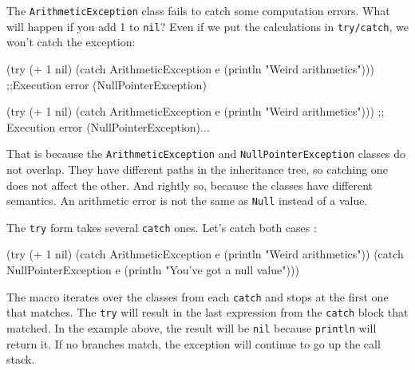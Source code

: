 The \verb|ArithmeticException| class fails to catch some computation errors.
What will happen if you add 1 to \verb|nil|? Even if we put the calculations in \verb|try/catch|, we won't catch the exception: 

\ifx\DEVICETYPE\MOBILE

\begin{english}
  \begin{clojure}
(try
  (+ 1 nil)
  (catch ArithmeticException e
    (println "Weird arithmetics")))
;;Execution error (NullPointerException)
  \end{clojure}
\end{english}

\else

\begin{english}
  \begin{clojure}
(try
  (+ 1 nil)
  (catch ArithmeticException e
    (println "Weird arithmetics")))
;; Execution error (NullPointerException)...
  \end{clojure}
\end{english}

\fi


\noindent
That is because the \verb|ArithmeticException| and \verb|NullPointerException| classes do not overlap. They have different paths in the inheritance tree, so catching one does not affect the other. And rightly so, because the classes have different semantics. An arithmetic error is not the same as \verb|Null| instead of a value.


The \verb|try| form takes several \verb|catch| ones. Let's catch both cases :

\begin{english}
  \begin{clojure}
(try
  (+ 1 nil)
  (catch ArithmeticException e
    (println "Weird arithmetics"))
  (catch NullPointerException e
    (println "You've got a null value")))
  \end{clojure}
\end{english}

The macro iterates over the classes from each \verb|catch| and stops at the first one that matches. The \verb|try| will result in the last expression from the \verb|catch| block that matched. In the example above, the result will be \verb|nil| because \verb|println| will return it. If no branches match, the exception will continue to go up the call stack.

